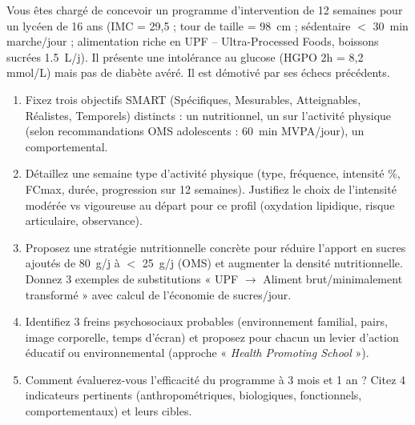 \documentclass[11pt]{article}
\begin{document}
\begin{exercice}
Vous êtes chargé de concevoir un programme d'intervention de 12 semaines pour un lycéen de 16 ans (IMC = 29,5 ; tour de taille = \SI{98}{cm} ; sédentaire $<$ \SI{30}{min} marche/jour ; alimentation riche en UPF -- Ultra-Processed Foods, boissons sucrées \SI{1,5}{L/j}). Il présente une intolérance au glucose (HGPO 2h = 8,2 mmol/L) mais pas de diabète avéré. Il est démotivé par ses échecs précédents.

\begin{enumerate}
    \item Fixez trois objectifs SMART (Spécifiques, Mesurables, Atteignables, Réalistes, Temporels) distincts : un nutritionnel, un sur l'activité physique (selon recommandations OMS adolescents : \SI{60}{min} MVPA/jour), un comportemental.
    \item Détaillez une semaine type d'activité physique (type, fréquence, intensité \%, FCmax, durée, progression sur 12 semaines). Justifiez le choix de l'intensité modérée vs vigoureuse au départ pour ce profil (oxydation lipidique, risque articulaire, observance).
    \item Proposez une stratégie nutritionnelle concrète pour réduire l'apport en sucres ajoutés de \SI{80}{g/j} à $<$ \SI{25}{g/j} (OMS) et augmenter la densité nutritionnelle. Donnez 3 exemples de substitutions « UPF $\to$ Aliment brut/minimalement transformé » avec calcul de l'économie de sucres/jour.
    \item Identifiez 3 freins psychosociaux probables (environnement familial, pairs, image corporelle, temps d'écran) et proposez pour chacun un levier d'action éducatif ou environnemental (approche « \textit{Health Promoting School} »).
    \item Comment évaluerez-vous l'efficacité du programme à 3 mois et 1 an ? Citez 4 indicateurs pertinents (anthropométriques, biologiques, fonctionnels, comportementaux) et leurs cibles.
\end{enumerate}
\end{exercice}
\end{document}
